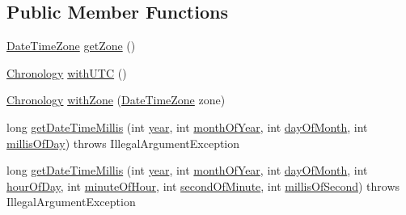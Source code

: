 \subsection*{Public Member Functions}
\begin{DoxyCompactItemize}
\item 
\hyperlink{classorg_1_1joda_1_1time_1_1_date_time_zone}{Date\-Time\-Zone} \hyperlink{classorg_1_1joda_1_1time_1_1chrono_1_1_g_j_chronology_ab6955bbd7f64c12cd95dfcc50d8a7b75}{get\-Zone} ()
\item 
\hyperlink{classorg_1_1joda_1_1time_1_1_chronology}{Chronology} \hyperlink{classorg_1_1joda_1_1time_1_1chrono_1_1_g_j_chronology_a76716c09d1606944ca70c1caeb07d7d9}{with\-U\-T\-C} ()
\item 
\hyperlink{classorg_1_1joda_1_1time_1_1_chronology}{Chronology} \hyperlink{classorg_1_1joda_1_1time_1_1chrono_1_1_g_j_chronology_a8c843958ed05dc4bddd6e6ce676f72c7}{with\-Zone} (\hyperlink{classorg_1_1joda_1_1time_1_1_date_time_zone}{Date\-Time\-Zone} zone)
\item 
long \hyperlink{classorg_1_1joda_1_1time_1_1chrono_1_1_g_j_chronology_ac5b9452c5be3a8f0fca5fd2d7cbf76b6}{get\-Date\-Time\-Millis} (int \hyperlink{classorg_1_1joda_1_1time_1_1chrono_1_1_assembled_chronology_aa1e3d4efcbe5275257c7815e4816561a}{year}, int \hyperlink{classorg_1_1joda_1_1time_1_1chrono_1_1_assembled_chronology_a838ab0bb1ded0d1dc6d53f307297c58c}{month\-Of\-Year}, int \hyperlink{classorg_1_1joda_1_1time_1_1chrono_1_1_assembled_chronology_a6aa5f9a31841b1ffa448660d36967f92}{day\-Of\-Month}, int \hyperlink{classorg_1_1joda_1_1time_1_1chrono_1_1_assembled_chronology_afccb0dba308d68f09089bff55f2849ed}{millis\-Of\-Day})  throws Illegal\-Argument\-Exception     
\item 
long \hyperlink{classorg_1_1joda_1_1time_1_1chrono_1_1_g_j_chronology_a07ffe800fc808cba2d031238c2fd15d1}{get\-Date\-Time\-Millis} (int \hyperlink{classorg_1_1joda_1_1time_1_1chrono_1_1_assembled_chronology_aa1e3d4efcbe5275257c7815e4816561a}{year}, int \hyperlink{classorg_1_1joda_1_1time_1_1chrono_1_1_assembled_chronology_a838ab0bb1ded0d1dc6d53f307297c58c}{month\-Of\-Year}, int \hyperlink{classorg_1_1joda_1_1time_1_1chrono_1_1_assembled_chronology_a6aa5f9a31841b1ffa448660d36967f92}{day\-Of\-Month}, int \hyperlink{classorg_1_1joda_1_1time_1_1chrono_1_1_assembled_chronology_a7bb60a080dea96b8103a530f88a4fb54}{hour\-Of\-Day}, int \hyperlink{classorg_1_1joda_1_1time_1_1chrono_1_1_assembled_chronology_afae2a5fd2073af85a1d2008d98313da7}{minute\-Of\-Hour}, int \hyperlink{classorg_1_1joda_1_1time_1_1chrono_1_1_assembled_chronology_adc867c7197cd2ae0d480003d22d9fdb7}{second\-Of\-Minute}, int \hyperlink{classorg_1_1joda_1_1time_1_1chrono_1_1_assembled_chronology_a16f1e731a421127a787ac71ffded4387}{millis\-Of\-Second})  throws Illegal\-Argument\-Exception     

\end{DoxyCompactItemize}
